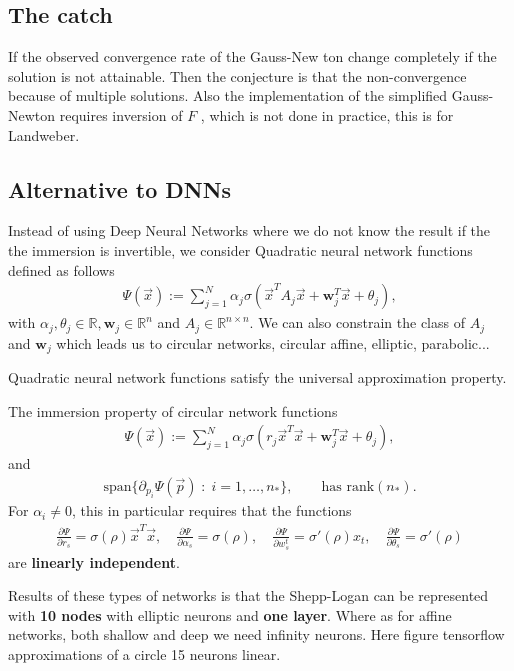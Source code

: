 \subsection{The catch}
If the observed convergence rate of the Gauss-New ton change completely if the
solution is not attainable. Then the conjecture is that the non-convergence
because of multiple solutions.
Also the implementation of the simplified Gauss-Newton requires inversion of
$F$ , which is not done in practice, this is for Landweber.

\subsection{Alternative to DNNs}
Instead of using Deep Neural Networks where we do not know the result if the
the immersion is invertible, we consider Quadratic neural network functions
defined as follows
\begin{align}
    \Psi(\vec{x}) := \sum_{j=1}^{N} \alpha_j\sigma\left(\vec{x}^{T}A_j\vec{x}
        + \mathbf{w}_j^{T}\vec{x} + \theta_j \right),
\end{align}
with $\alpha_j, \theta_j \in \mathbb{R}, \mathbf{w}_j \in \mathbb{R}^{n}$
and $A_j \in \mathbb{R}^{n \times n}$. We can also constrain the class of
$A_j$ and $\mathbf{w}_j$ which leads us to circular networks, circular
affine, elliptic, parabolic...
\begin{theorem}
    Quadratic neural network functions satisfy the universal approximation
    property.
\end{theorem}
The immersion property of circular network functions
\begin{align}
    \Psi(\vec{x}) := \sum_{j=1}^{N} \alpha_j\sigma\left(r_j\vec{x}^{T}\vec{x}
        + \mathbf{w}_j^{T}\vec{x} + \theta_j \right),
\end{align}
and
\begin{align}
    \text{span}\{\partial_{p_i}\Psi(\vec{p})\;:\;i=1,\ldots,n_*\}, \qquad
    \text{has rank}(n_*).
\end{align}
For $\alpha_i \neq 0$, this in particular requires that the functions
\begin{align}
    \frac{\partial \Psi}{\partial r_s}  = \sigma\left( \rho \right)
    \vec{x}^{T}\vec{x}, \quad
    \frac{\partial \Psi}{\partial \alpha_s}  = \sigma\left( \rho \right)
    , \quad
    \frac{\partial \Psi}{\partial w_s^{t}}  = \sigma'\left( \rho \right)
    x_t,\quad
    \frac{\partial \Psi}{\partial \theta_s}  = \sigma'\left( \rho \right)
\end{align}
are \textbf{linearly independent}.
\newline

Results of these types of networks is that the Shepp-Logan can be represented
with \textbf{10 nodes} with elliptic neurons and \textbf{one layer}. Where as
for affine networks, both shallow and deep we need infinity neurons. Here
figure tensorflow approximations of a circle 15 neurons linear.





